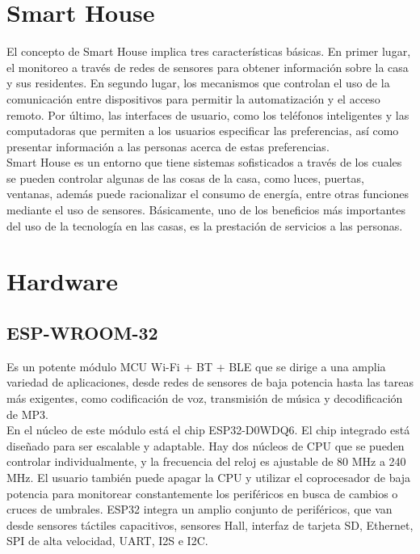 \section{Smart House}

El concepto de Smart House implica tres características básicas. En primer lugar, el monitoreo a través de redes de sensores para obtener información sobre la casa y sus residentes. En segundo lugar, los mecanismos que controlan el uso de la comunicación entre dispositivos para permitir la automatización y el acceso remoto. Por último, las interfaces de usuario, como los teléfonos inteligentes y las computadoras que permiten a los usuarios especificar las preferencias, así como presentar información a las personas acerca de estas preferencias. \\

Smart House es un entorno que tiene sistemas sofisticados a través de los cuales se pueden controlar algunas de las cosas de la casa, como luces, puertas, ventanas, además  puede racionalizar el consumo de energía, entre otras funciones mediante el uso de sensores. Básicamente, uno de los beneficios más importantes del uso de la tecnología en las casas, es la prestación de servicios a las personas.\cite{Howedi2016} \\

\section{Hardware}

\subsection{ESP-WROOM-32}

\cite{EW32} Es un potente módulo MCU Wi-Fi + BT + BLE que se dirige a una amplia variedad de aplicaciones, desde redes de sensores de baja potencia hasta las tareas más exigentes, como codificación de voz, transmisión de música y decodificación de MP3.\\

En el núcleo de este módulo está el chip ESP32-D0WDQ6. El chip integrado está diseñado para ser escalable y adaptable. Hay dos núcleos de CPU que se pueden controlar individualmente, y la frecuencia del reloj es ajustable de 80 MHz a 240 MHz. El usuario también puede apagar la CPU y utilizar el coprocesador de baja potencia para monitorear constantemente los periféricos en busca de cambios o cruces de umbrales. ESP32 integra un amplio conjunto de periféricos, que van desde sensores táctiles capacitivos, sensores Hall, interfaz de tarjeta SD, Ethernet, SPI de alta velocidad, UART, I2S e I2C.\\


